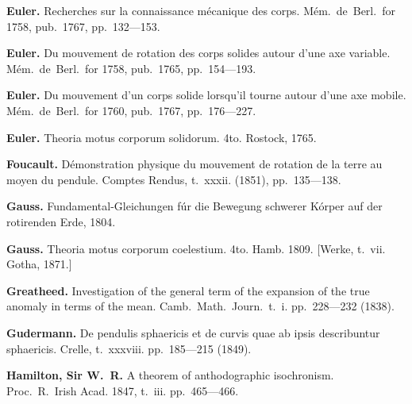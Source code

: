\documentclass[12pt,a4paper]{article}
\theoremstyle{definition}
\begin{document}
\vspace{0.5em}

\noindent\textbf{Euler.} Recherches sur la connaissance m\'{e}canique des corps. M\'{e}m.~de~Berl.~for 1758, pub.~1767, pp.~132---153.

\vspace{0.5em}

\noindent\textbf{Euler.} Du mouvement de rotation des corps solides autour d'une axe variable. M\'{e}m.~de~Berl.~for 1758, pub.~1765, pp.~154---193.

\vspace{0.5em}

\noindent\textbf{Euler.} Du mouvement d'un corps solide lorsqu'il tourne autour d'une axe mobile. M\'{e}m.~de~Berl.~for 1760, pub.~1767, pp.~176---227.

\vspace{0.5em}

\noindent\textbf{Euler.} Theoria motus corporum solidorum. 4to. Rostock, 1765.

\vspace{0.5em}

\noindent\textbf{Foucault.} D\'{e}monstration physique du mouvement de rotation de la terre au moyen du pendule. Comptes Rendus, t.~xxxii. (1851), pp.~135---138.

\vspace{0.5em}

\noindent\textbf{Gauss.} Fundamental-Gleichungen f\'{u}r die Bewegung schwerer K\'{o}rper auf der rotirenden Erde, 1804.

\vspace{0.5em}

\noindent\textbf{Gauss.} Theoria motus corporum coelestium. 4to. Hamb. 1809. [Werke, t.~vii. Gotha, 1871.]

\vspace{0.5em}

\noindent\textbf{Greatheed.} Investigation of the general term of the expansion of the true anomaly in terms of the mean. Camb.~Math.~Journ.~t.~i. pp.~228---232 (1838).

\vspace{0.5em}

\noindent\textbf{Gudermann.} De pendulis sphaericis et de curvis quae ab ipsis describuntur sphaericis. Crelle, t.~xxxviii. pp.~185---215 (1849).

\vspace{0.5em}

\noindent\textbf{Hamilton, Sir W.~R.} A theorem of anthodographic isochronism. Proc.~R.~Irish Acad. 1847, t.~iii. pp.~465---466.
\end{document}
